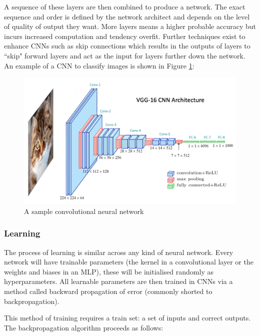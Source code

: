 A sequence of these layers are then combined to produce a network. The exact sequence and order is defined by the network architect and depends on the level of quality of output they want. More layers means a higher probable accuracy but incurs increased computation and tendency overfit. Further techniques exist to enhance CNNs such as skip connections which results in the outputs of layers to ``skip" forward layers and act as the input for layers further down the network. An example of a CNN to classify images is shown in Figure \ref{fig:sample-cnn}:

\begin{figure}[H]
    \centering
    \includegraphics[width=0.5\linewidth]{dissertation//figures/sample-cnn.png}
    \caption{A sample convolutional neural network\cite{kromydas2023convolutional}}
    \label{fig:sample-cnn}
\end{figure}

\subsubsection{Learning}

The process of learning is similar across any kind of neural network. Every network will have trainable parameters (the kernel in a convolutional layer or the weights and biases in an MLP), these will be initialised randomly as hyperparameters. All learnable parameters are then trained in CNNs via a method called backward propagation of error (commonly shorted to backpropagation)\cite{rojas2013neural}.

This method of training requires a train set: a set of inputs and correct outputs. The backpropagation algorithm proceeds as follows:


